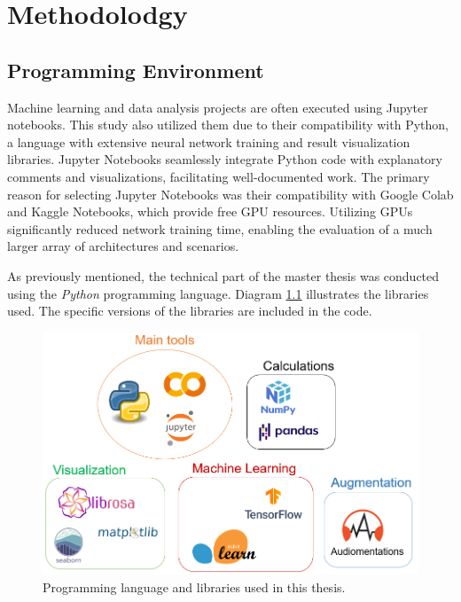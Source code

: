 \chapter{Methodolodgy}
\label{cha:Methodology}

\section{Programming Environment}
\label{sec:programmingEnv}
Machine learning and data analysis projects are often executed using Jupyter notebooks. This study also utilized them due to their compatibility with Python, a language with extensive neural network training and result visualization libraries. Jupyter Notebooks seamlessly integrate Python code with explanatory comments and visualizations, facilitating well-documented work. The primary reason for selecting Jupyter Notebooks was their compatibility with Google Colab and Kaggle Notebooks, which provide free GPU resources. Utilizing GPUs significantly reduced network training time, enabling the evaluation of a much larger array of architectures and scenarios.

As previously mentioned, the technical part of the master thesis was conducted using the \textit{Python} programming language. Diagram \ref{fig:pythonLibraries} illustrates the libraries used. The specific versions of the libraries are included in the code.

\begin{figure}[!htb]
    \centering
    \includegraphics[scale=0.55]{Images/python-libraries.png}
    \caption{Programming language and libraries used in this thesis.}
    \label{fig:pythonLibraries}
\end{figure}

